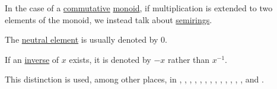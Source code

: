 \begin{concept}
\begin{thmenum}
    In the case of a \hyperref[def:binary_operation/commutative]{commutative} \hyperref[def:monoid]{monoid}, if multiplication is extended to two elements of the monoid, we instead talk about \hyperref[def:semiring]{semirings}.

     The \hyperref[def:monoid]{neutral element} is usually denoted by \( 0 \).

     If an \hyperref[def:monoid_inverse]{inverse} of \( x \) exists, it is denoted by \( -x \) rather than \( x^{-1} \).
  \end{thmenum}
\end{concept}
\begin{comments}
  \item This distinction is used, among other places, in
  \cite[def. A I.1]{Bourbaki1998Algebra1to3},
  \cite[3]{Lang2002Algebra},
  \cite[228]{Rotman2017AdvancedModernAlgebraPart2},
  \cite[119]{Knapp2016BasicAlgebra},
  \cite[20]{Yoshida1980FunctionalAnalysis},
  \cite[\S 8.3]{Schechter1997AnalysisHandbook},
  \cite[107]{АлександровМаркушевичХинчинИПр1951ЭнциклопедияТом1},
  \cite[33]{Зорич2019АнализЧасть1},
  \cite[14]{Винберг2014КурсАлгебры},
  \cite{Шафаревич1999ОсновныеПонятияАлгебры},
  \cite[138]{Кострикин2000АлгебраЧасть1},
  \cite[89]{ЦаленкоШульгейфер1974ОсновыТеорииКатегорий},
  \cite[126]{БелоусовТкачёв2004ДискретнаяМатематика},
  \cite[378]{Обрешков1962ВисшаАлгебра} and
  \cite[74]{ГеновМиховскиМоллов1991Алгебра}.
\end{comments}

